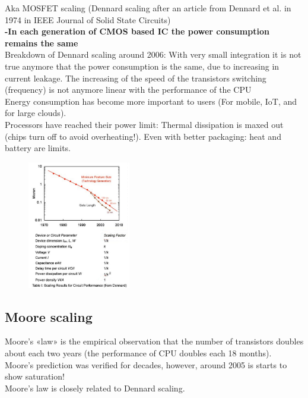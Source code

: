 Aka MOSFET scaling (Dennard scaling after an article from Dennard et al. in 1974 in IEEE Journal of Solid State Circuits)\\
\textbf{-In each generation of CMOS based IC the power
consumption remains the same}\\
Breakdown of Dennard scaling around 2006: With very small integration it is not true anymore that the power consumption is the same, due to increasing in current leakage. The increasing of the speed of the transistors switching (frequency) is not anymore linear with the performance of the CPU\\

Energy consumption has become more important to users (For mobile, IoT, and for large clouds).\\
Processors have reached their power limit: Thermal dissipation is maxed out (chips turn off to avoid
overheating!). Even with better packaging: heat and battery are limits.

\begin{figure}[ht]
    \centering
    \includegraphics[width=0.4\textwidth]{figure_parallel/dennard.png}\end{figure}
\FloatBarrier

\subsection{Moore scaling}


Moore’s «law» is the empirical
observation that the number of
transistors doubles about each two
years (the performance of CPU doubles each 18 months).\\
Moore’s prediction was verified for
decades, however, around 2005 is starts to show saturation!\\
Moore's law is closely related to Dennard scaling.


